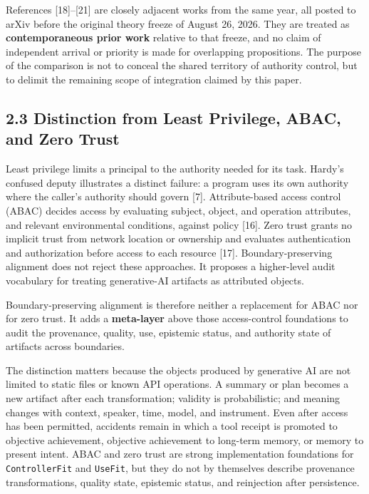 References {[}18{]}--{[}21{]} are closely adjacent works from the same year, all posted to arXiv before the original theory freeze of August 26, 2026. They are treated as \textbf{contemporaneous prior work} relative to that freeze, and no claim of independent arrival or priority is made for overlapping propositions. The purpose of the comparison is not to conceal the shared territory of authority control, but to delimit the remaining scope of integration claimed by this paper.

\subsection{2.3 Distinction from Least Privilege, ABAC, and Zero Trust}\label{distinction-from-least-privilege-abac-and-zero-trust}

Least privilege limits a principal to the authority needed for its task. Hardy's confused deputy illustrates a distinct failure: a program uses its own authority where the caller's authority should govern {[}7{]}. Attribute-based access control (ABAC) decides access by evaluating subject, object, and operation attributes, and relevant environmental conditions, against policy {[}16{]}. Zero trust grants no implicit trust from network location or ownership and evaluates authentication and authorization before access to each resource {[}17{]}. Boundary-preserving alignment does not reject these approaches. It proposes a higher-level audit vocabulary for treating generative-AI artifacts as attributed objects.

Boundary-preserving alignment is therefore neither a replacement for ABAC nor for zero trust. It adds a \textbf{meta-layer} above those access-control foundations to audit the provenance, quality, use, epistemic status, and authority state of artifacts across boundaries.

The distinction matters because the objects produced by generative AI are not limited to static files or known API operations. A summary or plan becomes a new artifact after each transformation; validity is probabilistic; and meaning changes with context, speaker, time, model, and instrument. Even after access has been permitted, accidents remain in which a tool receipt is promoted to objective achievement, objective achievement to long-term memory, or memory to present intent. ABAC and zero trust are strong implementation foundations for \passthrough{\lstinline!ControllerFit!} and \passthrough{\lstinline!UseFit!}, but they do not by themselves describe provenance transformations, quality state, epistemic status, and reinjection after persistence.

